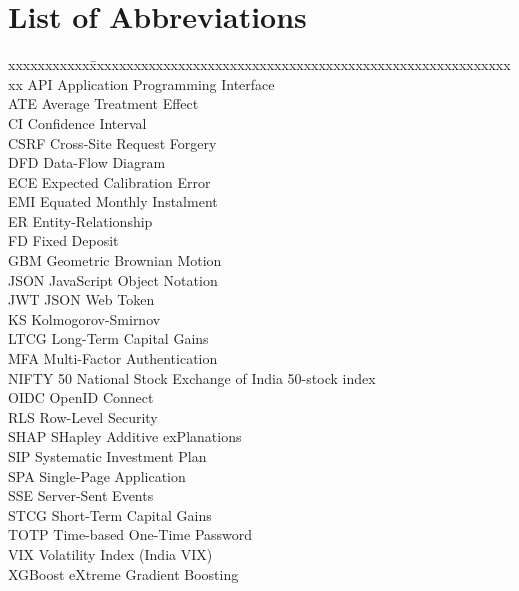 \chapter*{List of Abbreviations}
\begin{tabbing}
xxxxxxxxxxx\=xxxxxxxxxxxxxxxxxxxxxxxxxxxxxxxxxxxxxxxxxxxxxxxxxxxxxxxxxxx\kill
API \> Application Programming Interface\\
ATE \> Average Treatment Effect\\
CI \> Confidence Interval\\
CSRF \> Cross-Site Request Forgery\\
DFD \> Data-Flow Diagram\\
ECE \> Expected Calibration Error\\
EMI \> Equated Monthly Instalment\\
ER \> Entity-Relationship\\
FD \> Fixed Deposit\\
GBM \> Geometric Brownian Motion\\
JSON \> JavaScript Object Notation\\
JWT \> JSON Web Token\\
KS \> Kolmogorov-Smirnov\\
LTCG \> Long-Term Capital Gains\\
MFA \> Multi-Factor Authentication\\
NIFTY 50 \> National Stock Exchange of India 50-stock index\\
OIDC \> OpenID Connect\\
RLS \> Row-Level Security\\
SHAP \> SHapley Additive exPlanations\\
SIP \> Systematic Investment Plan\\
SPA \> Single-Page Application\\
SSE \> Server-Sent Events\\
STCG \> Short-Term Capital Gains\\
TOTP \> Time-based One-Time Password\\
VIX \> Volatility Index (India VIX)\\
XGBoost \> eXtreme Gradient Boosting\\
\end{tabbing}
